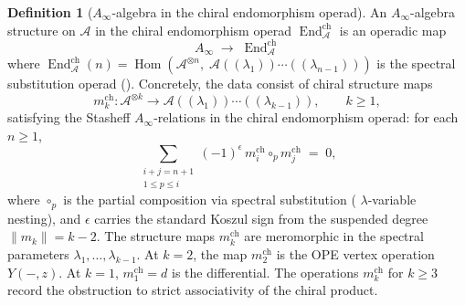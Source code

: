 \documentclass[11pt,reqno]{amsart}
\theoremstyle{definition}
\newtheorem{definition}[theorem]{Definition}
\theoremstyle{remark}
\newcommand{\cA}{\mathcal{A}}
\newcommand{\Ainf}{A_{\infty}}
\DeclareMathOperator{\Hom}{Hom}
\DeclareMathOperator{\End}{End}
\numberwithin{equation}{section}
\begin{document}
\begin{definition}[$\Ainf$-algebra in the chiral
endomorphism operad]
\label{def:ainf-chiral-endo}
An $\Ainf$-algebra structure on $\cA$ in the chiral
endomorphism operad $\End^{\mathrm{ch}}_\cA$ is an operadic
map
\begin{equation}\label{eq:ainf-map}
  \Ainf
  \;\longrightarrow\; \End^{\mathrm{ch}}_\cA
\end{equation}
where $\End^{\mathrm{ch}}_\cA(n)
= \Hom(\cA^{\otimes n},\;
\cA((\lambda_1))\cdots((\lambda_{n-1})))$ is the spectral
substitution operad
\textup{(}\cite[\S3]{Lorgat26I}\textup{)}. Concretely, the
data consist of chiral structure maps
\begin{equation}\label{eq:ch-mk}
  m_k^{\mathrm{ch}} \colon
  \cA^{\otimes k}
  \longrightarrow
  \cA((\lambda_1))\cdots((\lambda_{k-1})),
  \qquad k \geq 1,
\end{equation}
satisfying the Stasheff $\Ainf$-relations in the chiral
endomorphism operad: for each $n \geq 1$,
\begin{equation}\label{eq:stasheff-chiral}
  \sum_{\substack{i + j = n + 1 \\ 1 \leq p \leq i}}
  (-1)^{\epsilon}\,
  m_i^{\mathrm{ch}} \circ_p m_j^{\mathrm{ch}}
  \;=\; 0,
\end{equation}
where $\circ_p$ is the partial composition via spectral
substitution \textup{(}
$\lambda$-variable nesting\textup{)}, and $\epsilon$
carries the standard Koszul sign from the suspended degree
$\|m_k\| = k - 2$.
The structure maps $m_k^{\mathrm{ch}}$ are meromorphic in
the spectral parameters $\lambda_1, \ldots, \lambda_{k-1}$.
At $k = 2$, the map $m_2^{\mathrm{ch}}$ is the OPE vertex
operation $Y(-,z)$. At $k = 1$, $m_1^{\mathrm{ch}} = d$
is the differential. The operations $m_k^{\mathrm{ch}}$ for
$k \geq 3$ record the obstruction to strict associativity
of the chiral product.
\end{definition}
\end{document}
